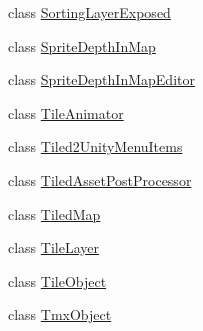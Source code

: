 \begin{DoxyCompactItemize}
\item 
class \mbox{\hyperlink{class_tiled2_unity_1_1_sorting_layer_exposed}{Sorting\+Layer\+Exposed}}
\item 
class \mbox{\hyperlink{class_tiled2_unity_1_1_sprite_depth_in_map}{Sprite\+Depth\+In\+Map}}
\item 
class \mbox{\hyperlink{class_tiled2_unity_1_1_sprite_depth_in_map_editor}{Sprite\+Depth\+In\+Map\+Editor}}
\item 
class \mbox{\hyperlink{class_tiled2_unity_1_1_tile_animator}{Tile\+Animator}}
\item 
class \mbox{\hyperlink{class_tiled2_unity_1_1_tiled2_unity_menu_items}{Tiled2\+Unity\+Menu\+Items}}
\item 
class \mbox{\hyperlink{class_tiled2_unity_1_1_tiled_asset_post_processor}{Tiled\+Asset\+Post\+Processor}}
\item 
class \mbox{\hyperlink{class_tiled2_unity_1_1_tiled_map}{Tiled\+Map}}
\item 
class \mbox{\hyperlink{class_tiled2_unity_1_1_tile_layer}{Tile\+Layer}}
\item 
class \mbox{\hyperlink{class_tiled2_unity_1_1_tile_object}{Tile\+Object}}
\item 
class \mbox{\hyperlink{class_tiled2_unity_1_1_tmx_object}{Tmx\+Object}}
\end{DoxyCompactItemize}

